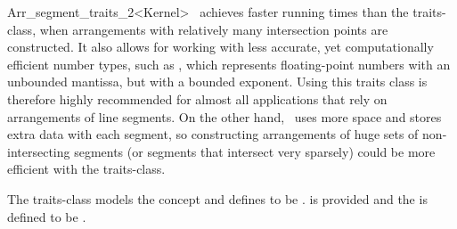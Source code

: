 \begin{ccRefClass}{Arr_segment_traits_2<Kernel>}
\ccRefName\ achieves faster running times than the
 traits-class, when
arrangements with relatively many intersection points are constructed.
It also allows for working with less accurate, yet computationally
efficient number types, such as , which
represents floating-point numbers with an unbounded mantissa, but with
a bounded exponent. Using this traits class is therefore highly recommended
for almost all applications that rely on arrangements of line segments.
On the other hand, \ccRefName\  uses more space and stores extra data with
each segment, so constructing arrangements of huge sets of non-intersecting
segments (or segments that intersect very sparsely) could be more efficient
with the  traits-class.

The traits-class models the  concept
and defines  to
be .
 is provided and the 
is defined to be .

 
\ccIsModel
     \\

\end{ccRefClass}

\ccRefPageEnd
